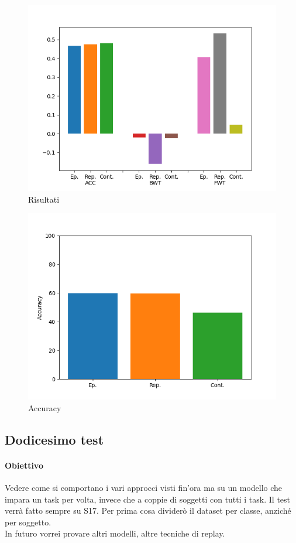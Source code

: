 \documentclass[11pt, a4paper, twoside, openright]{book}
\begin{document}
\begin{figure}[h]
    \centering
    \includegraphics[scale=0.75]{img/accbwtfwt.png}
    \caption{Risultati}
    \label{fig:accbwtfwt}
\end{figure}
\begin{figure}[h]
    \centering
    \includegraphics[scale=0.75]{img/accbwtfwt_accuracy.png}
    \caption{Accuracy}
    \label{fig:accbwtfwt_accuracy}
\end{figure}
\subsection{Dodicesimo test}
\paragraph{Obiettivo} Vedere come si comportano i vari approcci visti fin'ora ma su un modello che impara un task per volta, invece che a coppie di soggetti con tutti i task. Il test verrà fatto sempre su S17. Per prima cosa dividerò il dataset per classe, anziché per soggetto.\\
In futuro vorrei provare altri modelli, altre tecniche di replay.
\end{document}
